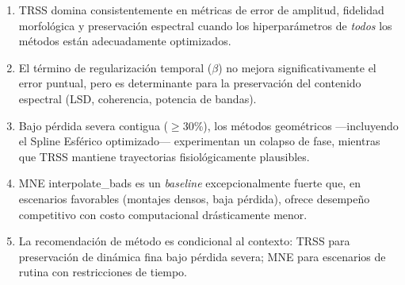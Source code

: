 \begin{enumerate}
    \item TRSS domina consistentemente en métricas de error de amplitud, fidelidad morfológica y preservación espectral cuando los hiperparámetros de \textit{todos} los métodos están adecuadamente optimizados.
    \item El término de regularización temporal ($\beta$) no mejora significativamente el error puntual, pero es determinante para la preservación del contenido espectral (LSD, coherencia, potencia de bandas).
    \item Bajo pérdida severa contigua ($\geq$30\%), los métodos geométricos —incluyendo el Spline Esférico optimizado— experimentan un colapso de fase, mientras que TRSS mantiene trayectorias fisiológicamente plausibles.
    \item MNE interpolate\_bads es un \textit{baseline} excepcionalmente fuerte que, en escenarios favorables (montajes densos, baja pérdida), ofrece desempeño competitivo con costo computacional drásticamente menor.
    \item La recomendación de método es condicional al contexto: TRSS para preservación de dinámica fina bajo pérdida severa; MNE para escenarios de rutina con restricciones de tiempo.
\end{enumerate}